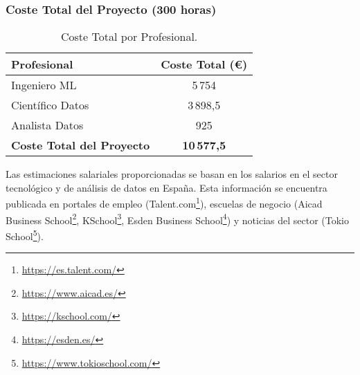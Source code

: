 \subsubsection*{Coste Total del Proyecto (300 horas)}\label{subsubsec.costpertotal}

\begin{table}[H]
\centering
\begin{tabular}{|l|c|}
\toprule
Profesional & Coste Total (€) \\
\midrule
Ingeniero ML & 5\,754 \\
Científico Datos & 3\,898,5 \\
Analista Datos & 925 \\
\midrule
\textbf{Coste Total del Proyecto} & \textbf{10\,577,5} \\
\bottomrule
\end{tabular}
\caption{Coste Total por Profesional.}
\label{tab:coste_total_profesional}
\end{table}

Las estimaciones salariales proporcionadas se basan en los salarios en el sector tecnológico y de análisis de datos en España. Esta información se encuentra publicada en portales de empleo (Talent.com\footnote{\url{https://es.talent.com/}}), escuelas de negocio (Aicad Business School\footnote{\url{https://www.aicad.es/}}, KSchool\footnote{\url{https://kschool.com/}}, Esden Business School\footnote{\url{https://esden.es/}}) y noticias del sector (Tokio School\footnote{\url{https://www.tokioschool.com/}}). 










